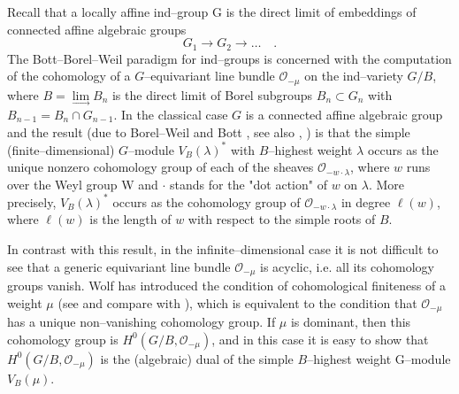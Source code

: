 \documentclass[12pt]{amsart}
\theoremstyle{remark}
\begin{document}
Recall that a locally affine ind--group G is the direct limit of embeddings of connected affine algebraic groups
$$
G_{1}\rightarrow G_{2}\rightarrow\ldots \quad .
$$
The Bott--Borel--Weil paradigm for ind--groups is concerned with the computation of the cohomology 
of a $G$--equivariant line bundle $\mathcal{O}_{-\mu}$ on the ind--variety $G/B$, where 
$B=\lim\limits_{\rightarrow}B_{n}$ is the direct limit of Borel subgroups $B_{n}\subset G_{n}$ 
with $B_{n-1} = B_{n} \cap G_{n-1}$. In the classical case $G$ is a connected affine algebraic group
and the result (due to Borel--Weil \cite{BW} and Bott \cite{B}, see also \cite{D1}, 
\cite{D2}) is that the simple (finite--dimensional) $G$--module $V_{B}(\lambda)^*$ with $B$--highest 
weight $\lambda$ occurs as the unique nonzero cohomology group of each of the sheaves 
$\mathcal{O}_{-w\cdot \lambda}$, where $w$ runs over the Weyl group W and $\cdot$ stands for 
the "dot action" of $w$ on $\lambda$. More precisely, $V_{B}(\lambda)^*$ occurs as the
cohomology group of $\mathcal{O}_{-w\cdot \lambda}$ in degree $\ell(w)$, where $\ell(w)$ is the length of $w$ with 
respect to the simple roots of $B$.


In contrast with this result, in the infinite--dimensional case it is not difficult to see that a generic equivariant 
line bundle $\mathcal{O}_{-\mu}$ is acyclic, i.e. all its cohomology groups vanish.  Wolf has 
introduced the condition of cohomological finiteness of a weight $\mu$ (see \cite{W} and 
compare with \cite{DPW}), which is equivalent to the condition that $\mathcal{O}_{-\mu}$ has a 
unique non--vanishing cohomology group. If $\mu$ is dominant, then this cohomology group is 
$H^0(G/B, \mathcal{O}_{-\mu})$, and in this case it is easy to show that 
$H^0(G/B, \mathcal{O}_{-\mu})$ is the (algebraic) dual of the simple $B$--highest weight 
G--module $V_{B}(\mu)$.
\end{document}
